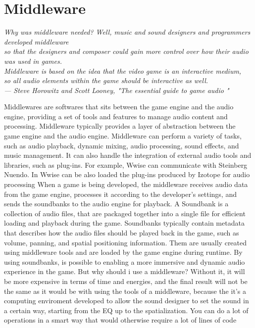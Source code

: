 \section{Middleware}
\begin{flushright}
	\itshape
	Why was middleware needed? Well, music and sound designers and programmers developed middleware \\
	so that the designers and composer could gain more control over how their audio was used in games.\\
	Middleware is based on the idea that the video game is an interactive medium, \\
	so all audio elements within the game should be interactive as well. \\
	\medskip
	--- Steve Horowitz and Scott Looney, "The essential guide to game audio "
\end{flushright}

Middlewares are softwares that sits between the game engine and the audio engine, providing a set of tools and features to manage audio content and processing. Middleware typically provides a layer of abstraction between the game engine and the audio engine.
Middleware can perform a variety of tasks, such as audio playback, dynamic mixing, audio processing, sound effects, and music management. It can also handle the integration of external audio tools and libraries, such as plug-ins. For example, Wwise can communicate with Steinberg Nuendo. In Wwise can be also loaded the plug-ins produced by Izotope for audio processing
When a game is being developed, the middleware receives audio data from the game engine, processes it according to the developer's settings, and sends the soundbanks to the audio engine for playback.
A Soundbank is a collection of audio files, that are packaged together into a single file for efficient loading and playback during the game.
Soundbanks typically contain metadata that describes how the audio files should be played back in the game, such as volume, panning, and spatial positioning information. Them are usually created using middleware tools and are loaded by the game engine during runtime. By using soundbanks, is possible to enabling a more immersive and dynamic audio experience in the game.
But why should i use a middleware? Without it, it will be more expensive in terms of time and energies, and the final result will not be the same as it would be with using the tools of a middleware, because the it's a computing enviroment developed to allow the sound designer to set the sound in a certain way, starting from the EQ up to the spatialization. You can do a lot of operations in a smart way that would otherwise require a lot of lines of code

